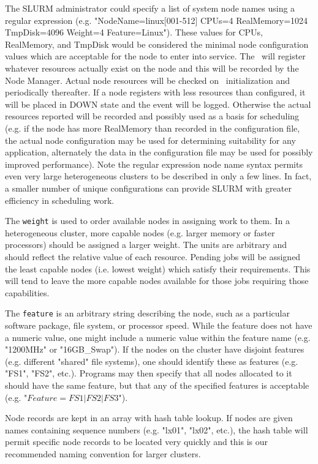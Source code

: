 The SLURM administrator could specify a list of system node
names using a regular expression (e.g. "NodeName=linux[001-512] CPUs=4
RealMemory=1024 TmpDisk=4096 Weight=4 Feature=Linux").  These values
for CPUs, RealMemory, and TmpDisk would be considered the minimal
node configuration values which are acceptable for the node to enter
into service.  The \slurmd\ will register whatever resources actually
exist on the node and this will be recorded by the Node Manager.
Actual node resources will be checked on \slurmd\ initialization and periodically
thereafter.  If a node registers with less resources than configured, it
will be placed in DOWN state and the event will be logged.  Otherwise the
actual resources reported will be recorded and possibly used as a basis 
for scheduling (e.g. if the node has more RealMemory than recorded in 
the configuration file, the actual node configuration may be used for 
determining suitability for any application, alternately the data in 
the configuration file may be used for possibly improved performance).
Note the regular expression node name syntax permits even very large
heterogeneous clusters to be described in only a few lines.  In fact,
a smaller number of unique configurations can provide SLURM with greater
efficiency in scheduling work.

The {\tt weight} is used to order available nodes in assigning work to them.
In a heterogeneous cluster, more capable nodes (e.g. larger memory
or faster processors) should be assigned a larger weight.  The units
are arbitrary and should reflect the relative value of each resource.
Pending jobs will be assigned the least capable nodes (i.e. lowest
weight) which satisfy their requirements.  This will tend to leave the
more capable nodes available for those jobs requiring those capabilities.

The {\tt feature} is an arbitrary string describing the node, such as
a particular software package, file system, or processor speed.
While the feature does not have a numeric value, one might include a
numeric value within the feature name (e.g. "1200MHz" or "16GB\_Swap").
If the nodes on the cluster have disjoint features (e.g. different
"shared" file systems), one should identify these as features (e.g. "FS1",
"FS2", etc.).  Programs may then specify that all nodes allocated to it
should have the same feature, but that any of the specified features is
acceptable (e.g. "$Feature=FS1|FS2|FS3$").

Node records are kept in an array with hash table lookup. 
If nodes are given names containing sequence numbers (e.g. "lx01", "lx02", 
etc.), the hash table will permit specific node records to be located 
very quickly and this is our recommended naming convention for larger 
clusters.

